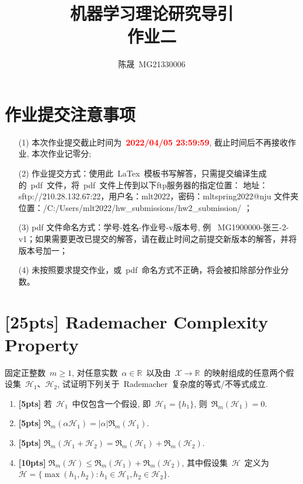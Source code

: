 \documentclass[a4paper,UTF8]{article}
\numberwithin{equation}{section}
\begin{document}
\title{机器学习理论研究导引\\
作业二}
\author{陈晟\, MG21330006} 
\maketitle

\section*{作业提交注意事项}

\begin{tcolorbox}
    \begin{enumerate}
        \item[(1)] 本次作业提交截止时间为~\textcolor{red}{\textbf{2022/04/05  23:59:59}}, 截止时间后不再接收作业, 本次作业记零分; 
        \item[(2)] 作业提交方式：使用此~LaTex~模板书写解答，只需提交编译生成的~pdf~文件，将~pdf~文件上传到以下ftp服务器的指定位置：
        \newline 地址：sftp://210.28.132.67:22，用户名：mlt2022，密码：mltspring2022@nju
        \newline 文件夹位置：/C:/Users/mlt2022/hw\_submissions/hw2\_submission/  ；
        \item[(3)] pdf 文件命名方式：学号-姓名-作业号-v版本号, 例~ MG1900000-张三-2-v1；如果需要更改已提交的解答，请在截止时间之前提交新版本的解答，并将版本号加一；
        \item[(4)] 未按照要求提交作业，或~pdf~命名方式不正确，将会被扣除部分作业分数。
    \end{enumerate}
\end{tcolorbox}

\newpage

\section{[25pts] Rademacher Complexity Property}

\noindent 固定正整数~$m\geqslant 1$, 对任意实数~$\alpha\in \mathbb{R}$~以及由~$\mathcal{X} \rightarrow \mathbb{R}$~的映射组成的任意两个假设集~$\mathcal{H}_1$、$\mathcal{H}_2$, 试证明下列关于~Rademacher~复杂度的等式/不等式成立. 
\begin{enumerate}[(1)]
    \item \textbf{[5pts]} 若~$\mathcal{H}_1$~中仅包含一个假设, 即~$\mathcal{H}_1=\{h_1\}$,  则~$\mathfrak{R}_m(\mathcal{H}_1) = 0$.
    \item \textbf{[5pts]} $\mathfrak{R}_m(\alpha \mathcal{H}_1) = |\alpha|\mathfrak{R}_m(\mathcal{H}_1)$.
    \item \textbf{[5pts]} $\mathfrak{R}_m(\mathcal{H}_1 + \mathcal{H}_2) = \mathfrak{R}_m(\mathcal{H}_1) + \mathfrak{R}_m(\mathcal{H}_2)$.
    \item \textbf{[10pts]} $\mathfrak{R}_m(\mathcal{H}) \leqslant \mathfrak{R}_m(\mathcal{H}_1) + \mathfrak{R}_m(\mathcal{H}_2)$, 其中假设集~$\mathcal{H}$~定义为~$\mathcal{H} = \{\max(h_1,h_2): h_1\in \mathcal{H}_1, h_2\in \mathcal{H}_2\}$.
\end{enumerate}
\end{document}
